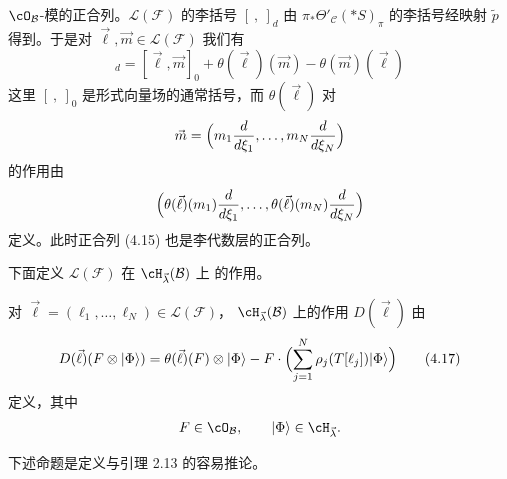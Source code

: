 $\cO_\mathcal{B}$-模的正合列。$\mathcal{L}(\mathcal{F})$ 的李括号
$[\ ,\ ]_d$ 由 $\pi_*\Theta'_\mathcal{C}(*S)_\pi$ 的李括号经映射 $\tilde{p}$
得到。于是对 $\vec{\ell},\vec{m}\in\mathcal{L}(\mathcal{F})$ 我们有
\begin{equation}
  [\vec{\ell},\vec{m}]_d
  = [\vec{\ell},\vec{m}]_0+\theta(\vec{\ell})(\vec{m})
    -\theta(\vec{m})(\vec{\ell}) \tag{4.16}
\end{equation}
这里 $[\ ,\ ]_0$ 是形式向量场的通常括号，而 $\theta(\vec{\ell})$ 对
\[
  \vec{m}=\Bigl(m_1\frac{d}{d\xi_1},\dots,m_N\frac{d}{d\xi_N}\Bigr)
\]
的作用由
\[
  \Bigl(\theta(\vec{\ell})(m_1)\frac{d}{d\xi_1},\dots,
  \theta(\vec{\ell})(m_N)\frac{d}{d\xi_N}\Bigr)
\]
定义。此时正合列 (4.15) 也是李代数层的正合列。

下面定义 $\mathcal{L}(\mathcal{F})$ 在 $\cH_{\vec{\lambda}}(\mathcal{B})$ 上
的作用。

\begin{definition}[4.5]
对 $\vec{\ell}=(\ell_1,\dots,\ell_N)\in\mathcal{L}(\mathcal{F})$，
$\cH_{\vec{\lambda}}(\mathcal{B})$ 上的作用 $D(\vec{\ell})$ 由
\begin{equation}
  D(\vec{\ell})(F\otimes|\Phi\rangle)
  = \theta(\vec{\ell})(F)\otimes|\Phi\rangle
  -F\cdot\Bigl(\sum_{j=1}^N\rho_j(T[\ell_j])|\Phi\rangle\Bigr)
  \tag{4.17}
\end{equation}
定义，其中
\[
  F\in\cO_\mathcal{B},\qquad |\Phi\rangle\in\cH_{\vec{\lambda}} .
\]
\end{definition}

下述命题是定义与引理 2.13 的容易推论。


